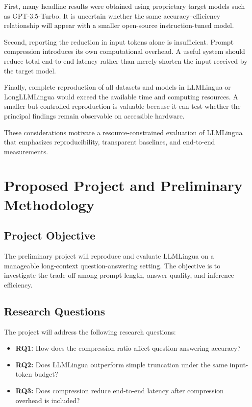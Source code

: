 \documentclass[10pt,a4paper,twocolumn]{article}
\begin{document}
First, many headline results were obtained using proprietary target models such as GPT-3.5-Turbo. It is uncertain whether the same accuracy--efficiency relationship will appear with a smaller open-source instruction-tuned model.

Second, reporting the reduction in input tokens alone is insufficient. Prompt compression introduces its own computational overhead. A useful system should reduce total end-to-end latency rather than merely shorten the input received by the target model.

Finally, complete reproduction of all datasets and models in LLMLingua or LongLLMLingua would exceed the available time and computing resources. A smaller but controlled reproduction is valuable because it can test whether the principal findings remain observable on accessible hardware.

These considerations motivate a resource-constrained evaluation of LLMLingua that emphasizes reproducibility, transparent baselines, and end-to-end measurements.

\section{Proposed Project and Preliminary Methodology}

\subsection{Project Objective}

The preliminary project will reproduce and evaluate LLMLingua on a manageable long-context question-answering setting. The objective is to investigate the trade-off among prompt length, answer quality, and inference efficiency.

\subsection{Research Questions}

The project will address the following research questions:

\begin{itemize}
    \item \textbf{RQ1:} How does the compression ratio affect question-answering accuracy?
    \item \textbf{RQ2:} Does LLMLingua outperform simple truncation under the same input-token budget?
    \item \textbf{RQ3:} Does compression reduce end-to-end latency after compression overhead is included?
\end{itemize}
\end{document}
